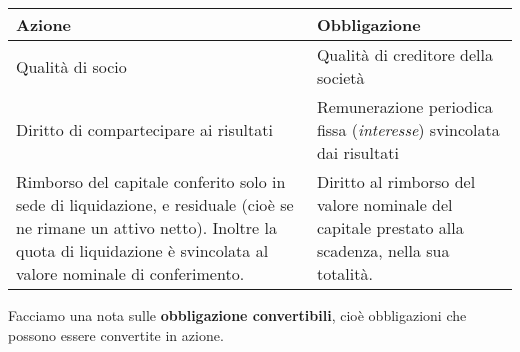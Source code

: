 \documentclass[a4paper,11pt]{article}
\begin{document}
\begin{table}[H]
	\center {}
	\begin{tabular} {p{7cm} | p{7cm}}
		\bfseries Azione & \bfseries Obbligazione \\
		\hline 
		Qualità di socio & Qualità di creditore della società \\
		Diritto di compartecipare ai risultati & Remunerazione periodica fissa (\textit{interesse}) svincolata dai risultati \\
		Rimborso del capitale conferito solo in sede di liquidazione, e residuale (cioè se ne rimane un attivo netto). Inoltre la quota di liquidazione è svincolata al valore nominale di conferimento. & Diritto al rimborso del valore nominale del capitale prestato alla scadenza, nella sua totalità. \\
	\end{tabular}
\end{table}

Facciamo una nota sulle \textbf{obbligazione convertibili}, cioè obbligazioni che possono essere convertite in azione.
\end{document}
